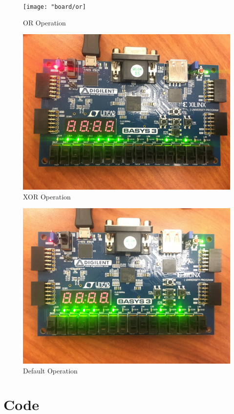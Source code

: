 \documentclass[11pt]{article}
\newcommand{\Verilog}[2][]{%
	
}
\begin{document}
\begin{figure}[ht]
	\centering
	\texttt{[image: "board/or]}
	\caption{OR Operation}
	\includegraphics[width=12cm]{"board/xor"}
	\caption{XOR Operation}
\end{figure}
\begin{figure}[ht]
	\centering
	\includegraphics[width=12cm]{"board/default"}
	\caption{Default Operation}
\end{figure}


\section*{Code}
\Verilog[firstline=23,caption=Register Implementation]{../verilog_code/register.sv}
\Verilog[firstline=23,caption=Register Test Bench]{../verilog_code/register_test.sv}
\Verilog[firstline=23,caption=ALU Implementation]{../verilog_code/alu.sv}
\Verilog[firstline=23,caption=ALU Test Bench]{../verilog_code/alu_test.sv}
\Verilog[firstline=23,caption=Top-Level Implementation]{../verilog_code/top_lab9.sv}
\end{document}
